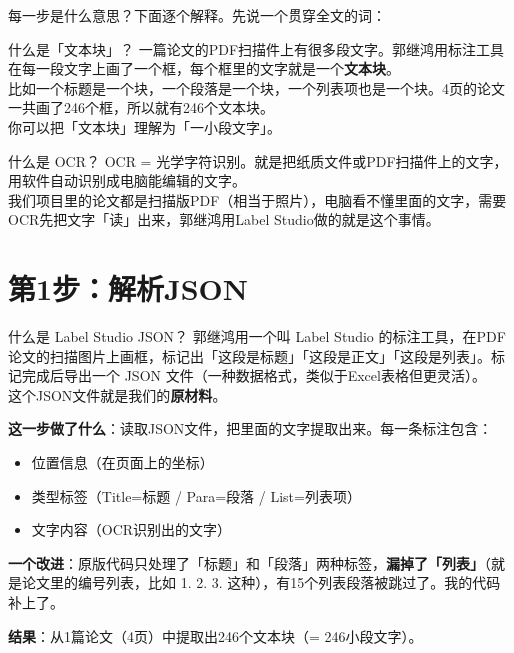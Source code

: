 \documentclass[12pt,a4paper,landscape]{article}
\begin{document}
每一步是什么意思？下面逐个解释。先说一个贯穿全文的词：

\begin{termbox}{什么是「文本块」？}
一篇论文的PDF扫描件上有很多段文字。郭继鸿用标注工具在每一段文字上画了一个框，每个框里的文字就是一个\textbf{文本块}。\\[2pt]
比如一个标题是一个块，一个段落是一个块，一个列表项也是一个块。4页的论文一共画了246个框，所以就有246个文本块。\\[2pt]
你可以把「文本块」理解为「一小段文字」。
\end{termbox}

\begin{termbox}{什么是 OCR？}
OCR = 光学字符识别。就是把纸质文件或PDF扫描件上的文字，用软件自动识别成电脑能编辑的文字。\\[2pt]
我们项目里的论文都是扫描版PDF（相当于照片），电脑看不懂里面的文字，需要OCR先把文字「读」出来，郭继鸿用Label Studio做的就是这个事情。
\end{termbox}

\section{第1步：解析JSON}

\begin{termbox}{什么是 Label Studio JSON？}
郭继鸿用一个叫 Label Studio 的标注工具，在PDF论文的扫描图片上画框，标记出「这段是标题」「这段是正文」「这段是列表」。标记完成后导出一个 JSON 文件（一种数据格式，类似于Excel表格但更灵活）。\\[2pt]
这个JSON文件就是我们的\textbf{原材料}。
\end{termbox}

\textbf{这一步做了什么}：读取JSON文件，把里面的文字提取出来。每一条标注包含：
\begin{itemize}[nosep]
  \item 位置信息（在页面上的坐标）
  \item 类型标签（Title=标题 / Para=段落 / List=列表项）
  \item 文字内容（OCR识别出的文字）
\end{itemize}

\textbf{一个改进}：原版代码只处理了「标题」和「段落」两种标签，\textbf{漏掉了「列表」}（就是论文里的编号列表，比如 1. 2. 3. 这种），有15个列表段落被跳过了。我的代码补上了。

\textbf{结果}：从1篇论文（4页）中提取出246个文本块（= 246小段文字）。
\end{document}
